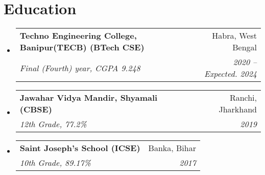 \documentclass[letterpaper,11pt]{article}
\makeatletter
\newcommand{\resumeSubheading}[4]{
  \vspace{-2pt}\item
    \begin{tabular*}{0.97\textwidth}[t]{l@{\extracolsep{\fill}}r}
      \textbf{#1} & #2 \\
      \textit{\small#3} & \textit{\small #4} \\
    \end{tabular*}\vspace{-7pt}
}
\newcommand{\resumeSubHeadingListStart}{\begin{itemize}[leftmargin=0.15in, label={}]}
\newcommand{\resumeSubHeadingListEnd}{\end{itemize}}
\makeatother
\begin{document}
\section{Education}
  \resumeSubHeadingListStart
    \resumeSubheading
      {Techno Engineering College, Banipur(TECB) (BTech CSE)} {Habra, West Bengal}
      {Final (Fourth) year, CGPA 9.248}{2020 -- Expected. 2024}

    \resumeSubheading
      {Jawahar Vidya Mandir, Shyamali (CBSE)}{Ranchi, Jharkhand}
      {12th Grade, 77.2\%}{2019}

    \resumeSubheading
      {Saint Joseph's School (ICSE)}{Banka, Bihar}
      {10th Grade, 89.17\%}{2017}
  \resumeSubHeadingListEnd
\end{document}
